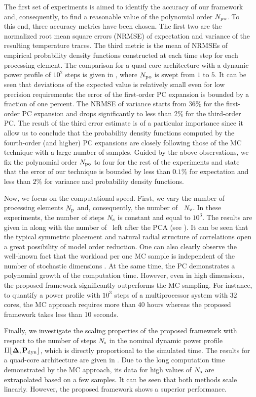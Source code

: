 
The first set of experiments is aimed to identify the accuracy of our framework and, consequently, to find a reasonable value of the polynomial order ${N_\text{po}}$. To this end, three accuracy metrics have been chosen. The first two are the normalized root mean square errors (NRMSE) of expectation and variance of the resulting temperature traces. The third metric is the mean of NRMSEs of empirical probability density functions constructed at each time step for each processing element. The comparison for a quad-core architecture with a dynamic power profile of $10^2$ steps is given in , where ${N_\text{po}}$ is swept from $1$ to $5$. It can be seen that deviations of the expected value is relatively small even for low precision requirements: the error of the first-order PC expansion is bounded by a fraction of one percent. The NRMSE of variance starts from $36\%$ for the first-order PC expansion and drops significantly to less than $2\%$ for the third-order PC. The result of the third error estimate is of a particular importance since it allow us to conclude that the probability density functions computed by the fourth-order (and higher) PC expansions are closely following those of the MC technique with a large number of samples. Guided by the above observations, we fix the polynomial order ${N_\text{po}}$ to four for the rest of the experiments and state that the error of our technique is bounded by less than $0.1\%$ for expectation and less than $2\%$ for variance and probability density functions.


Now, we focus on the computational speed. First, we vary the number of processing elements ${N_\text{p}}$ and, consequently, the number of \rvs\ ${N_\text{v}}$. In these experiments, the number of steps $N_\text{s}$ is constant and equal to $10^3$. The results are given in  along with the number of \rvs\ left after the PCA (see ). It can be seen that the typical symmetric placement and natural radial structure of correlations \cite{cheng2011} open a great possibility of model order reduction. One can also clearly observe the well-known fact that the workload per one MC sample is independent of the number of stochastic dimensions \cite{maitre2010}. At the same time, the PC demonstrates a polynomial growth \cite{heiss2008} of the computation time. However, even in high dimensions, the proposed framework significantly outperforms the MC sampling. For instance, to quantify a power profile with $10^3$ steps of a multiprocessor system with $32$ cores, the MC approach requires more than $40$ hours whereas the proposed framework takes less than 10 seconds.

Finally, we investigate the scaling properties of the proposed framework with respect to the number of steps $N_\text{s}$ in the nominal dynamic power profile $\profPdyn$, which is directly proportional to the simulated time. The results for a quad-core architecture are given in . Due to the long computation time demonstrated by the MC approach, its data for high values of $N_\text{s}$ are extrapolated based on a few samples. It can be seen that both methods scale linearly. However, the proposed framework shows a superior performance.
